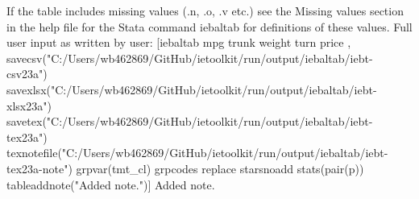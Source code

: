 If the table includes missing values (.n, .o, .v etc.) see the Missing values section in the help file for the Stata command iebaltab for definitions of these values. Full user input as written by user: [iebaltab mpg trunk weight turn price , savecsv("C:/Users/wb462869/GitHub/ietoolkit/run/output/iebaltab/iebt-csv23a") savexlsx("C:/Users/wb462869/GitHub/ietoolkit/run/output/iebaltab/iebt-xlsx23a") savetex("C:/Users/wb462869/GitHub/ietoolkit/run/output/iebaltab/iebt-tex23a") texnotefile("C:/Users/wb462869/GitHub/ietoolkit/run/output/iebaltab/iebt-tex23a-note") grpvar(tmt\_cl) grpcodes replace starsnoadd stats(pair(p)) tableaddnote("Added note.")] Added note.
